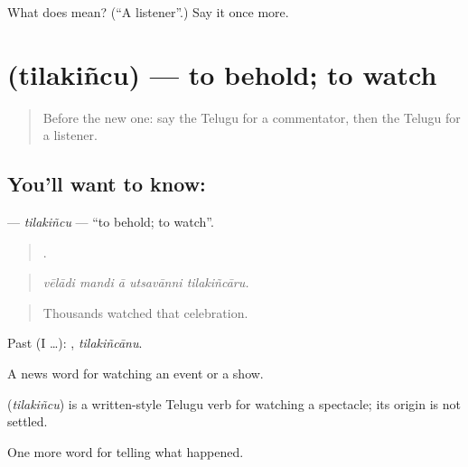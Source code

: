 \begin{tcolorbox}[breakable,colback=teal!4,colframe=teal!35!black,title={Before you move on}]
What does  mean? (\textquotedblleft{}A listener\textquotedblright{}.) Say it once more.
\end{tcolorbox}
\section[\texorpdfstring{\te{తిలకించు} (tilakiñcu)}{తిలకించు (tilakiñcu)}]{ (tilakiñcu) — to behold; to watch}

\label{lesson:TE-C374-tilakincu}



\begin{quote}
Before the new one: say the Telugu for a commentator, then the Telugu for a listener.
\end{quote}

\subsection*{You'll want to know: }
\textbf{} — \emph{tilakiñcu} — \textquotedblleft{}to behold; to watch\textquotedblright{}.

\begin{quote}
    .
\end{quote}

\begin{quote}
\emph{vēlādi mandi ā utsavānni tilakiñcāru.}
\end{quote}

\begin{quote}
Thousands watched that celebration.
\end{quote}

Past (I …): , \emph{tilakiñcānu}.

A news word for watching an event or a show.

\begin{cousinweb}
\textbf{} (\emph{tilakiñcu}) is a written-style Telugu verb for watching a spectacle; its origin is not settled.
\end{cousinweb}

\begin{grammarlens}[title={What you've built}]
One more word for telling what happened.
\end{grammarlens}

